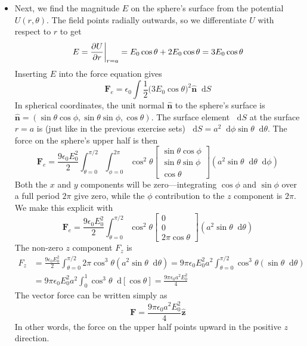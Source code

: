 \documentclass[11pt, a4paper]{article}
\newcommand{\diff}{\mathop{}\!\mathrm{d}} %
\renewcommand{\vec}[1]{\bm{#1}} %
\newcommand{\uvec}[1]{\hat{\vec{#1}}} %
\newcommand{\ee}{\epsilon_{0}}  %
\begin{document}
\begin{itemize}
	\item Next, we find the magnitude $ E $ on the sphere's surface from the potential $ U(r, \theta) $. The field points radially outwards, so we differentiate $ U $ with respect to $ r $ to get
	\begin{equation*}
		E = \pdv{U}{r} \bigg |_{r = a} = E_{0} \cos \theta + 2 E_{0} \cos \theta = 3E_{0} \cos \theta
	\end{equation*}
	Inserting $ E $ into the force equation gives
	\begin{equation*}
		\vec{F}_{e} = \ee \int \frac{1}{2}\big(3E_{0} \cos \theta\big)^{2} \uvec{n} \diff S
	\end{equation*}
	In spherical coordinates, the unit normal $ \uvec{n} $ to the sphere's surface is $ \uvec{n} = (\sin \theta \cos \phi, \sin \theta \sin \phi, \cos \theta) $. The surface element $ \diff S $ at the surface $ r = a $ is (just like in the previous exercise sets) $ \diff S = a^{2} \diff \phi \sin \theta \diff \theta $. The force on the sphere's upper half is then
	\begin{equation*}
		\vec{F}_{e} = \frac{9\ee E_{0}^{2}}{2} \int_{\theta = 0}^{\pi/2}\int_{\phi = 0}^{2\pi} \cos^{2} \theta 
		\begin{bmatrix}
			\sin \theta \cos \phi\\
			\sin \theta \sin \phi\\
			\cos \theta
		\end{bmatrix}
		(a^{2} \sin \theta \diff \theta \diff \phi) 
	\end{equation*}
	Both the $ x $ and $ y $ components will be zero---integrating $ \cos \phi $ and $ \sin \phi $ over a full period $ 2 \pi $ give zero, while the $ \phi $ contribution to the $ z $ component is $ 2\pi $.  We make this explicit with
	\begin{equation*}
		\vec{F}_{e} = \frac{9\ee E_{0}^{2}}{2} \int_{\theta = 0}^{\pi/2}\cos^{2} \theta 
		\begin{bmatrix}
			0\\
			0\\
			2\pi \cos \theta 
		\end{bmatrix}
		(a^{2} \sin \theta \diff \theta) 
	\end{equation*}
	The non-zero $ z $ component $ F_{z} $ is 
	\begin{align*}
		F_{z} &= \frac{9\ee E_{0}^{2}}{2} \int_{\theta = 0}^{\pi/2}2\pi \cos^{3} \theta (a^{2} \sin \theta \diff \theta) = 9\pi\ee E_{0}^{2}a^{2} \int_{\theta = 0}^{\pi/2} \cos^{3} \theta (\sin \theta \diff \theta)\\
		& =  9\pi\ee E_{0}^{2}a^{2} \int_{0}^{1} \cos^{3} \theta \diff [\cos \theta] = \frac{9\pi\ee a^{2} E_{0}^{2}}{4}
	\end{align*}
	The vector force can be written simply as
	\begin{equation*}
		\vec{F} = \frac{9\pi\ee a^{2} E_{0}^{2}}{4} \uvec{z}
	\end{equation*}
	In other words, the force on the upper half points upward in the positive $ z $ direction.	
	
\end{itemize}
\end{document}
